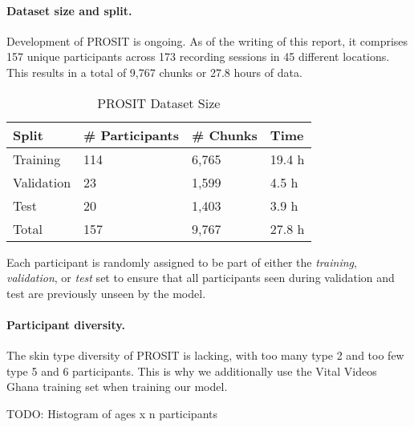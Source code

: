 \documentclass{article}
\begin{document}
\paragraph{Dataset size and split.}
Development of PROSIT is ongoing.
As of the writing of this report, it comprises 157 unique participants across 173 recording sessions in 45 different locations.
This results in a total of 9,767 chunks or 27.8 hours of data.

\begin{table}[h!]
  \caption{PROSIT Dataset Size}
  \label{prosit-table}
  \centering
  \begin{tabular}{llll}
    \toprule
    Split      & \# Participants & \# Chunks & Time   \\
    \midrule
    Training   & 114 			 & 6,765     & 19.4 h \\
    Validation & 23 			 & 1,599     & 4.5 h  \\
    Test       & 20     			 & 1,403     & 3.9 h  \\
    \midrule
    Total      & 157			 & 9,767  	 & 27.8 h \\
    \bottomrule
  \end{tabular}
\end{table}

Each participant is randomly assigned to be part of either the \textit{training}, \textit{validation}, or \textit{test} set to ensure that all participants seen during validation and test are previously unseen by the model.

\paragraph{Participant diversity.}
The skin type diversity of PROSIT is lacking, with too many type 2 and too few type 5 and 6 participants.
This is why we additionally use the Vital Videos Ghana training set when training our model.

TODO: Histogram of ages x n participants
\end{document}
